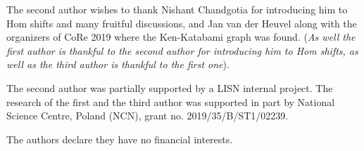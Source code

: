\documentclass{article}
\begin{document}
The second author wishes to thank Nishant Chandgotia for introducing him to Hom shifts and many fruitful discussions, and Jan van der Heuvel along with the organizers of CoRe 2019 where the Ken-Katabami graph was found. (\textit{As well the first author is thankful to the second author for introducing him to Hom shifts, 
as well as the third author is thankful to the first one}). 

The second author was partially supported by a LISN internal project. The research of the first and the third author was supported in part by  National Science Centre, Poland (NCN), grant no. 2019/35/B/ST1/02239. 

 The authors declare they have no financial interests.



\end{document}
